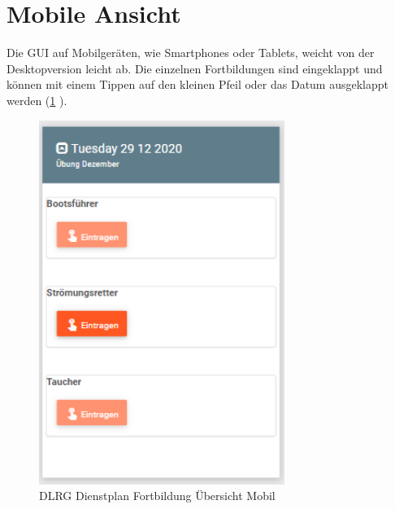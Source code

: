 \section{Mobile Ansicht}
\label{sec:training_mobile}
Die GUI auf Mobilgeräten, wie \zB Smartphones oder Tablets, weicht von der Desktopversion leicht ab. Die einzelnen Fortbildungen sind eingeklappt und können mit einem Tippen auf den kleinen Pfeil oder das Datum ausgeklappt werden (\ref{fig:view_training_mobile_close} \textit{}). 


\begin{figure}[h]
 \begin{addmargin}{-0.2\linewidth}
   \centering 
   \includegraphics[width=8cm]{Bilder/view_training_mobile.png}
 \end{addmargin} 
 \caption[Dienste Übersicht Mobil]{DLRG Dienstplan Fortbildung Übersicht Mobil}
 \label{fig:view_training_mobile_close}
\end{figure}